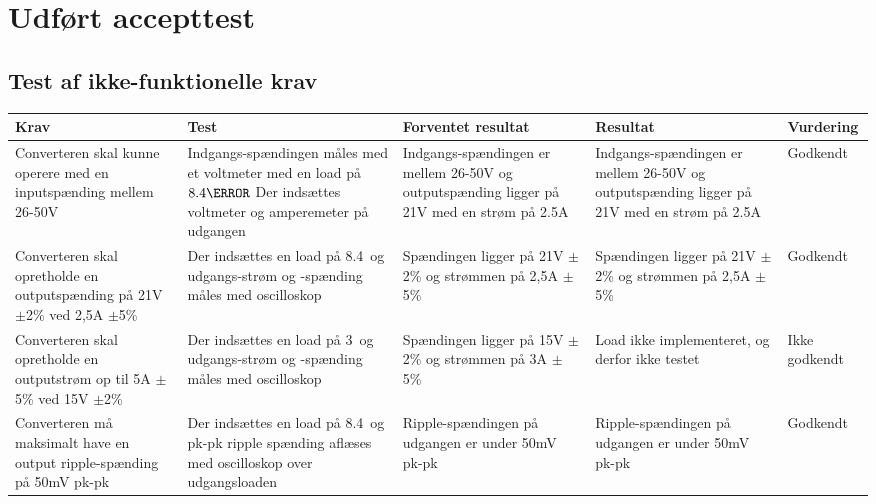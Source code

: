 \chapter{Udført accepttest}
\section{Test af ikke-funktionelle krav}

\begin{tabularx}{\textwidth}{|X|X|X|X|X|}
	\hline
	\textbf{Krav} & \textbf{Test} & \textbf{Forventet resultat} & \textbf{Resultat} & \textbf{Vurdering} \\ \hline
	Converteren skal kunne operere med en inputspænding mellem 26-50V & Indgangs-spændingen måles med et voltmeter med en load på $8.4\ohm$ Der indsættes voltmeter og amperemeter på udgangen & Indgangs-spændingen er mellem 26-50V og outputspænding ligger på 21V med en strøm på 2.5A & Indgangs-spændingen er mellem 26-50V og outputspænding ligger på 21V med en strøm på 2.5A & Godkendt\\ \hline
	Converteren skal opretholde en outputspænding på 21V $\pm$2\% ved 2,5A $\pm$5\% & Der indsættes en load på 8.4\ohm\ og udgangs-strøm og -spænding måles med oscilloskop & Spændingen ligger på 21V $\pm$2\% og strømmen på 2,5A $\pm$5\% & Spændingen ligger på 21V $\pm$2\% og strømmen på 2,5A $\pm$5\% & Godkendt \\ \hline
	Converteren skal opretholde en outputstrøm op til 5A $\pm$5\% ved 15V $\pm$2\% & Der indsættes en load på 3\ohm\ og udgangs-strøm og -spænding måles med oscilloskop & Spændingen ligger på 15V $\pm$2\% og strømmen på 3A $\pm$5\% & Load ikke implementeret, og derfor ikke testet & Ikke godkendt \\ \hline
	Converteren må maksimalt have en output ripple-spænding på 50mV pk-pk & Der indsættes en load på 8.4\ohm\ og pk-pk ripple spænding aflæses med oscilloskop over udgangsloaden & Ripple-spændingen på udgangen er under 50mV pk-pk & Ripple-spændingen på udgangen er under 50mV pk-pk & Godkendt \\ \hline
\end{tabularx}




